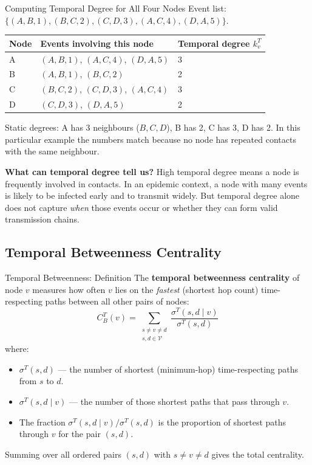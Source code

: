 \begin{examplebox}{Computing Temporal Degree for All Four Nodes}
Event list: $\{(A,B,1), (B,C,2), (C,D,3), (A,C,4), (D,A,5)\}$.

\begin{center}
\begin{tabular}{lll}
\toprule
\textbf{Node} & \textbf{Events involving this node} & \textbf{Temporal degree $k_v^T$} \\
\midrule
A & $(A,B,1)$, $(A,C,4)$, $(D,A,5)$ & 3 \\
B & $(A,B,1)$, $(B,C,2)$             & 2 \\
C & $(B,C,2)$, $(C,D,3)$, $(A,C,4)$ & 3 \\
D & $(C,D,3)$, $(D,A,5)$             & 2 \\
\bottomrule
\end{tabular}
\end{center}

Static degrees: A has 3 neighbours ($B,C,D$), B has 2, C has 3, D has 2. In this particular
example the numbers match because no node has repeated contacts with the same neighbour.

\textbf{What can temporal degree tell us?} High temporal degree means a node is frequently
involved in contacts. In an epidemic context, a node with many events is likely to be infected
early and to transmit widely. But temporal degree alone does not capture \textit{when} those
events occur or whether they can form valid transmission chains.
\end{examplebox}

\subsection{Temporal Betweenness Centrality}

\begin{conceptbox}{Temporal Betweenness: Definition}
The \textbf{temporal betweenness centrality} of node $v$ measures how often $v$ lies on the
\textit{fastest} (shortest hop count) time-respecting paths between all other pairs of nodes:
\[
  C_B^T(v) = \sum_{\substack{s \neq v \neq d \\ s,d \in \mathcal{V}}}
             \frac{\sigma^T(s, d \mid v)}{\sigma^T(s, d)}
\]
where:
\begin{itemize}[noitemsep]
  \item $\sigma^T(s, d)$ --- the number of shortest (minimum-hop) time-respecting paths from
        $s$ to $d$.
  \item $\sigma^T(s, d \mid v)$ --- the number of those shortest paths that pass through $v$.
  \item The fraction $\sigma^T(s, d \mid v) / \sigma^T(s, d)$ is the proportion of shortest
        paths through $v$ for the pair $(s, d)$.
\end{itemize}
Summing over all ordered pairs $(s, d)$ with $s \neq v \neq d$ gives the total centrality.
\end{conceptbox}

